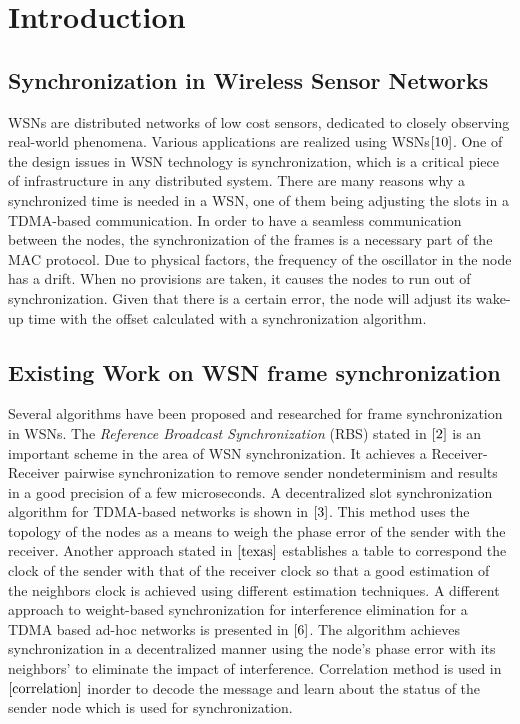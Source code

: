 \documentclass[journal]{IEEEtran}
\begin{document}
\section{\textbf{Introduction}}
\subsection{\textbf{Synchronization in Wireless Sensor Networks}}
\noindent WSNs are distributed networks of low cost sensors, dedicated to closely observing real-world phenomena.
 Various applications are realized using WSNs$\cite{10}$. One of the design issues in WSN technology is synchronization, which is a critical piece of infrastructure in any distributed system. There are many reasons why a synchronized time is needed in a WSN, one of them being adjusting the slots in a TDMA-based communication. \newline
In order to have a seamless communication between the nodes, the synchronization of the frames is a necessary part of the MAC
protocol. Due to physical factors, the frequency of the oscillator in the node has a drift. When no provisions are taken, it causes the nodes to run out of synchronization. Given that there is a certain error, the node will adjust its wake-up time with the offset calculated with a synchronization algorithm.
\subsection{\textbf{Existing Work on WSN frame synchronization}}
\noindent Several algorithms have been proposed and researched for
frame synchronization in WSNs. The \textit{Reference Broadcast
Synchronization} (RBS) stated in $\cite{2}$ is an important scheme
in the area of WSN synchronization. It achieves a Receiver-Receiver
pairwise synchronization to remove sender nondeterminism and results
in a good precision of a few microseconds. A decentralized slot
synchronization algorithm  for TDMA-based networks is shown in
$\cite{3}$. This method uses the topology of the nodes as a means to
weigh the phase error of the sender with the receiver. \newline
Another approach stated in $\cite{texas}$ establishes a table to
correspond the clock of the sender with that of the receiver clock
so that a good estimation of the neighbors clock is achieved using
different estimation techniques. A different approach to
weight-based synchronization for interference elimination for a TDMA
based ad-hoc networks is presented in $\cite{6}$. The algorithm
achieves synchronization in a decentralized manner using the node's
phase error with its neighbors' to eliminate the impact of
interference. Correlation method is used in $\cite{correlation}$
inorder to decode the message and learn about the status of the
sender node which is used for synchronization.
\end{document}
